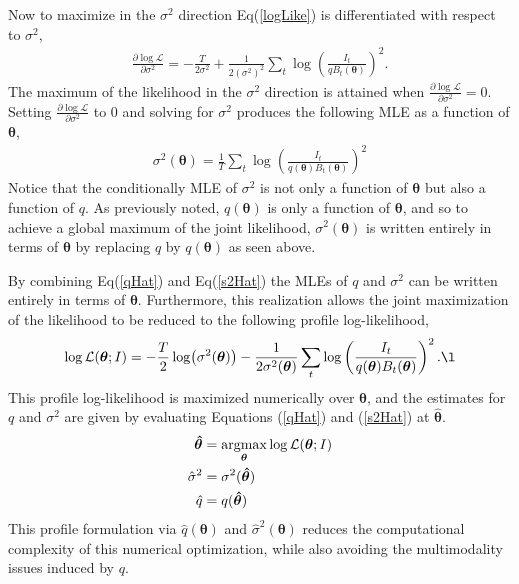 \documentclass[12pt]{article}
\newcommand{\argmax}{\operatornamewithlimits{argmax}}
\begin{document}
%
Now to maximize in the $\sigma^2$ direction Eq(\ref{logLike}) is 
differentiated with respect to $\sigma^2$,
%
\begin{align}
\frac{\partial \log\mathcal{L}}{\partial \sigma^2} = -\frac{T}{2\sigma^2} + \frac{1}{2(\sigma^2)^2}\sum_t \log\left(\frac{I_t}{qB_t(\bm{\theta})}\right)^2.
\end{align}
%
The maximum of the likelihood in the $\sigma^2$ direction is attained when 
$\frac{\partial \log\mathcal{L}}{\partial \sigma^2}=0$. Setting 
$\frac{\partial \log\mathcal{L}}{\partial \sigma^2}$ to 0 and solving for
$\sigma^2$ produces the following MLE as a function of $\bm{\theta}$,
%
\begin{align}
\sigma^2(\bm{\theta}) = \frac{1}{T}\sum_t \log\left(\frac{I_t}{q(\bm{\theta})B_t(\bm{\theta})}\right)^2 \label{s2Hat}
\end{align}
%
Notice that the conditionally MLE of $\sigma^2$ is not only a function of 
$\bm{\theta}$ but also a function of $q$. As previously noted, $q(\bm{\theta})$ 
is only a function of $\bm{\theta}$, and so to achieve a global maximum of the 
joint likelihood, $\sigma^2(\bm \theta)$ is written entirely in terms of 
$\bm \theta$ by replacing $q$ by $q(\bm{\theta})$ as seen above.

%
By combining Eq(\ref{qHat}) and Eq(\ref{s2Hat}) the MLEs of $q$ and $\sigma^2$ 
can be written entirely in terms of $\bm{\theta}$. Furthermore, this 
realization allows the joint maximization of the likelihood to be reduced to the 
following profile log-likelihood,
\begin{align}
\log\mathcal{L}(\bm{\theta}; I) = - \frac{T}{2}\log( \sigma^2(\bm{\theta})) - \frac{1}{2 \sigma^2(\bm{\theta})}\sum_t \log\left(\frac{I_t}{q(\bm{\theta})B_t(\bm{\theta})}\right)^2. \l
\end{align}
%
This profile log-likelihood is maximized numerically over $\bm{\theta}$, and the 
estimates for $q$ and $\sigma^2$ are given by evaluating Equations (\ref{qHat}) 
and (\ref{s2Hat}) at $\bm{\hat\theta}$. 
\begin{align}
\bm{\hat \theta} &= \argmax_{\bm{\theta}} \log\mathcal{L}(\bm{\theta}; I)\\
\hat \sigma^2 &= \sigma^2(\bm{\hat\theta})\\
\hat q &= q(\bm{\hat\theta})
\end{align}
%
This profile formulation via $\hat q(\bm{\theta})$ and 
$\hat \sigma^2(\bm{\theta})$ reduces the computational complexity of this
numerical optimization, while also avoiding the multimodality issues induced 
by $q$. 
\end{document}
